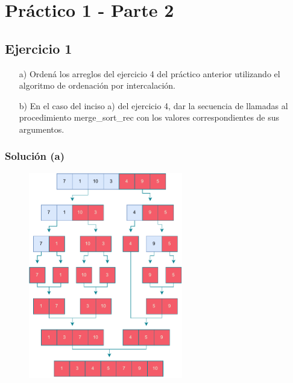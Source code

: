 \chapter{Práctico 1 - Parte 2}
\section{Ejercicio 1}

\begin{itemize}
    \item[a)] Ordená los arreglos del ejercicio 4 del práctico anterior utilizando el algoritmo de ordenación por intercalación.
    \item[b)] En el caso del inciso a) del ejercicio 4, dar la secuencia de llamadas al procedimiento merge\_sort\_rec con los valores correspondientes de sus argumentos.
  \end{itemize}

\subsection{Solución (a)}

\begin{figure}[h]
    \centering
    \includegraphics[width=0.6\textwidth]{./estáticos/1a.pdf}
\end{figure}

